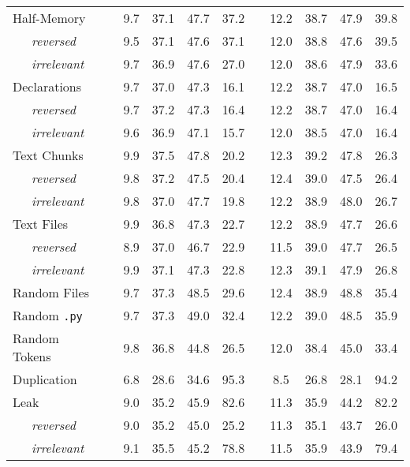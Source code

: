 \documentclass{standalone}
\begin{document}
\begin{table}
{\begin{tabular}{lc cc>{\columncolor{gray!30}}cc c cc>{\columncolor{gray!30}}cc}
        \cmidrule(lr){1-1}
        Half-Memory & & 9.7 & 37.1 & 47.7 & 37.2 & & 12.2 & 38.7 & 47.9 & 39.8 \\
        ~~~\textit{reversed} & & 9.5 & 37.1 & 47.6 & 37.1 & & 12.0 & 38.8 & 47.6 & 39.5 \\
        ~~~\textit{irrelevant} & & 9.7 & 36.9 & 47.6 & 27.0 & & 12.0 & 38.6 & 47.9 & 33.6 \\
        \cmidrule(lr){1-1}
        Declarations & & 9.7 & 37.0 & 47.3 & 16.1 & & 12.2 & 38.7 & 47.0 & 16.5 \\
        ~~~\textit{reversed} & & 9.7 & 37.2 & 47.3 & 16.4 & & 12.2 & 38.7 & 47.0 & 16.4 \\
        ~~~\textit{irrelevant} & & 9.6 & 36.9 & 47.1 & 15.7 & & 12.0 & 38.5 & 47.0 & 16.4 \\
        \cmidrule(lr){1-1}
        Text Chunks & & 9.9 & 37.5 & 47.8 & 20.2 & & 12.3 & 39.2 & 47.8 & 26.3 \\
        ~~~\textit{reversed} & & 9.8 & 37.2 & 47.5 & 20.4 & & 12.4 & 39.0 & 47.5 & 26.4 \\
        ~~~\textit{irrelevant} & & 9.8 & 37.0 & 47.7 & 19.8 & & 12.2 & 38.9 & 48.0 & 26.7 \\
        \cmidrule(lr){1-1}
        Text Files & & 9.9 & 36.8 & 47.3 & 22.7 & & 12.2 & 38.9 & 47.7 & 26.6 \\
        ~~~\textit{reversed} & & 8.9 & 37.0 & 46.7 & 22.9 & & 11.5 & 39.0 & 47.7 & 26.5 \\
        ~~~\textit{irrelevant} & & 9.9 & 37.1 & 47.3 & 22.8 & & 12.3 & 39.1 & 47.9 & 26.8 \\
        \cmidrule(lr){1-1}
        Random Files & & 9.7 & 37.3 & 48.5 & 29.6 & & 12.4 & 38.9 & 48.8 & 35.4 \\
        Random \texttt{.py} & & 9.7 & 37.3 & 49.0 & 32.4 & & 12.2 & 39.0 & 48.5 & 35.9 \\
        Random Tokens & & 9.8 & 36.8 & 44.8 & 26.5 & & 12.0 & 38.4 & 45.0 & 33.4 \\
        \midrule
        Duplication & & 6.8 & 28.6 & 34.6 & 95.3 & & 8.5 & 26.8 & 28.1 & 94.2 \\
        Leak & & 9.0 & 35.2 & 45.9 & 82.6 & & 11.3 & 35.9 & 44.2 & 82.2 \\
        ~~~\textit{reversed} & & 9.0 & 35.2 & 45.0 & 25.2 & & 11.3 & 35.1 & 43.7 & 26.0 \\
        ~~~\textit{irrelevant} & & 9.1 & 35.5 & 45.2 & 78.8 & & 11.5 & 35.9 & 43.9 & 79.4 \\
        
        \bottomrule
    \end{tabular}
}
\end{table}
\end{document}
